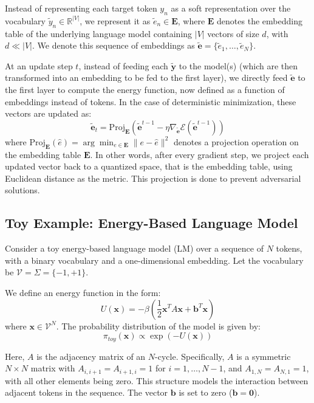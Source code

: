 \documentclass{article}
\begin{document}
Instead of representing each target token \( y_n \) as a soft representation over the vocabulary \( \tilde{y}_n \in \mathbb{R}^{|V|} \), we represent it as \( \tilde{e}_n \in \boldsymbol{E} \), where \( \boldsymbol{E} \) denotes the embedding table of the underlying language model containing \( |V| \) vectors of size \( d \), with \( d \ll |V| \). We denote this sequence of embeddings as \( \tilde{\boldsymbol{e}} = \{\tilde{e}_1, \ldots, \tilde{e}_N\} \).

At an update step \( t \), instead of feeding each \( \tilde{\boldsymbol{y}} \) to the model(s) (which are then transformed into an embedding to be fed to the first layer), we directly feed \( \tilde{\boldsymbol{e}} \) to the first layer to compute the energy function, now defined as a function of embeddings instead of tokens. In the case of deterministic minimization, these vectors are updated as:
\[ \tilde{\boldsymbol{e}}_t = \text{Proj}_{\boldsymbol{E}}\left(\tilde{\boldsymbol{e}}^{t-1} - \eta \nabla_{\tilde{\boldsymbol{e}}} \mathcal{E}(\tilde{\boldsymbol{e}}^{t-1})\right) \]
where \( \text{Proj}_{\boldsymbol{E}}(\hat{e}) = \arg\min_{e \in \boldsymbol{E}} \|e - \hat{e}\|^2 \) denotes a projection operation on the embedding table \( \boldsymbol{E} \). In other words, after every gradient step, we project each updated vector back to a quantized space, that is the embedding table, using Euclidean distance as the metric. This projection is done to prevent adversarial solutions.


\subsection{Toy Example: Energy-Based Language Model}
Consider a toy energy-based language model (LM) over a sequence of \(N\) tokens, with a binary vocabulary and a one-dimensional embedding. Let the vocabulary be \(\mathcal{V} = \Sigma = \{-1, +1\}\).

We define an energy function in the form:
\[ U(\boldsymbol{x}) = - \beta \left(\frac{1}{2}\boldsymbol{x}^T A \boldsymbol{x} + \boldsymbol{b}^T \boldsymbol{x}\right) \]
where \(\boldsymbol{x} \in \mathcal{V}^N\). The probability distribution of the model is given by:
\[ \pi_{toy}(\boldsymbol{x}) \propto \exp(-U(\boldsymbol{x})) \]

Here, \(A\) is the adjacency matrix of an \(N\)-cycle. Specifically, \(A\) is a symmetric \(N \times N\) matrix with \(A_{i,i+1} = A_{i+1,i} = 1\) for \(i = 1, \ldots, N-1\), and \(A_{1,N} = A_{N,1} = 1\), with all other elements being zero. This structure models the interaction between adjacent tokens in the sequence. The vector \(\boldsymbol{b}\) is set to zero (\(\boldsymbol{b} = \boldsymbol{0}\)).
\end{document}
